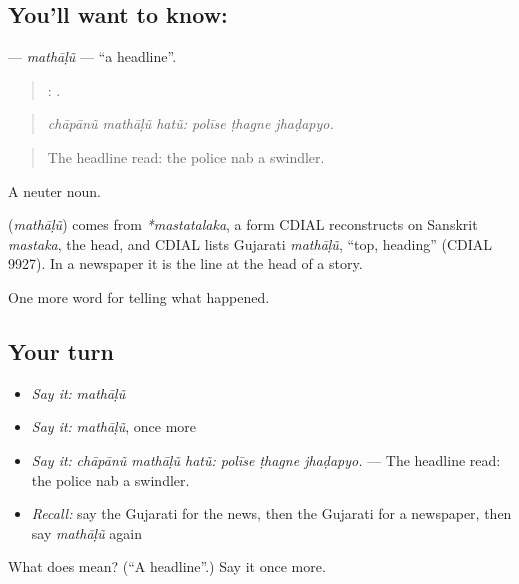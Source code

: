 \subsection*{You'll want to know: }
\textbf{} — \emph{mathāḷũ} — \textquotedblleft{}a headline\textquotedblright{}.

\begin{quote}
  :   .
\end{quote}

\begin{quote}
\emph{chāpānũ mathāḷũ hatũ: polīse ṭhagne jhaḍapyo.}
\end{quote}

\begin{quote}
The headline read: the police nab a swindler.
\end{quote}

A neuter noun.

\begin{cousinweb}
\textbf{} (\emph{mathāḷũ}) comes from \emph{*mastatalaka}, a form CDIAL reconstructs on Sanskrit \emph{mastaka}, the head, and CDIAL lists Gujarati \emph{mathāḷũ}, \textquotedblleft{}top, heading\textquotedblright{} (CDIAL 9927). In a newspaper it is the line at the head of a story.
\end{cousinweb}

\begin{grammarlens}[title={What you've built}]
One more word for telling what happened.
\end{grammarlens}

\subsection*{Your turn}
\begin{itemize}
\raggedright
  \item \emph{Say it:} \emph{mathāḷũ}
  \item \emph{Say it:} \emph{mathāḷũ}, once more
  \item \emph{Say it:} \emph{chāpānũ mathāḷũ hatũ: polīse ṭhagne jhaḍapyo.} — The headline read: the police nab a swindler.
  \item \emph{Recall:} say the Gujarati for the news, then the Gujarati for a newspaper, then say \emph{mathāḷũ} again
\end{itemize}

\begin{tcolorbox}[breakable,colback=teal!4,colframe=teal!35!black,title={Before you move on}]
What does  mean? (\textquotedblleft{}A headline\textquotedblright{}.) Say it once more.
\end{tcolorbox}
